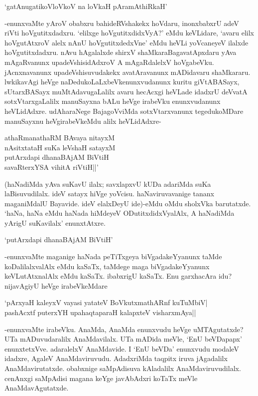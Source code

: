 \begin{shloka}
`gatAnugatikoVloVkoV na loVkaH pAramAthiRkaH'
\end{shloka} 

-enunxvaMte yAroV obabxru bahideRVshakekx hoVdaru, inonxbabxrU adeV riVti hoVgutitxdadxru. `elilxge hoVgutitxdidxVyA?' eMdu keVLidare, `avaru elilx hoVgutAtxroV alelx nAnU hoVgutitxdedxVne' eMdu heVLi yoVcaneyeV ilalxde hoVgutitxdadxru. nAvu hAgalalxde shirxV shaMkaraBagavatApxdaru yAva mAgaRvanunx upadeVshisidAdxroV A mAgaRdalelxV hoVgabeVku. jAcnxnavanunx upadeVshisuvudakekx avatAravanunx mADidavaru shaMkararu. lwkikavAgi heVge naDedukoLaLxbeVkenunxvudanunx kuritu giVtABASayx, sUtarxBASayx muMtAdavugaLalilx avaru hecAcxgi heVLade idadxrU deVvatA sotxVtarxgaLalilx manuSayxna bALu heVge irabeVku enunxvudanunx heVLidAdxre. udAharaNege BajagoVviMda sotxVtarxvanunx tegedukoMDare manuSayxnu heVgirabeVkeMdu alilx heVLidAdxre-

\begin{shloka}
athaRmanathaRM BAvaya nitayxM\\
nAsitxtataH suKa leVshaH satayxM\\
putArxdapi dhanaBAjAM BiVtiH\\
savaRterxYSA vihitA riVtiH||'
\end{shloka} 

(haNadiMda yAva suKavU ilalx; savxlapxvU kUDa adariMda suKa laBisuvudilalx. ideV satayx hiVge yoVcisu. haNaviruvavanige tananx maganiMdalU Bayavide. ideV elalxDeyU ide)-eMdu oMdu sholxVka barutatxde. `haNa, haNa eMdu haNada hiMdeyeV ODutitxdidxVyalAlx, A haNadiMda yArigU suKavilalx' enunxtAtxre.

\begin{shloka}
`putArxdapi dhanaBAjAM BiVtiH'
\end{shloka}

-enunxvaMte maganige haNada peTiTxgeya biVgadakeYyanunx taMde koDalilalxvalAlx eMdu kaSaTx, taMdege maga biVgadakeYyanunx keVLutAtxnalAlx eMdu kaSaTx. ibabxrigU kaSaTx. Enu garxhacAra idu? nijavAgiyU heVge irabeVkeMdare

\begin{shloka}
`pArxyaH kaleyxV vayasi yatateV BoVkutxmathARnf kuTuMbiV|\\
pashAcxtf puterxYH upahaqtaparaH kalapxteV visharxmAya|| 
\end{shloka}

-enunxvaMte irabeVku. AnaMda, AnaMda enunxvudu heVge uMTAgutatxde? UTa mADuvudaralilx AnaMdavilalx. UTa mADida meVle, `EnU beVDapapx' enunxtetxVve. adaralelxV AnaMdavide. I `EnU beVDa' enunxvudu modaleV idadxre, AgaleV AnaMdaviruvudu. AdadxriMda taqpitx iruva jAgadalilx AnaMdavirutatxde. obabxnige saMpAdisuva kAladalilx AnaMdaviruvudilalx. cenAnxgi saMpAdisi magana keYge javAbAdxri koTaTx meVle AnaMdavAgutatxde.

